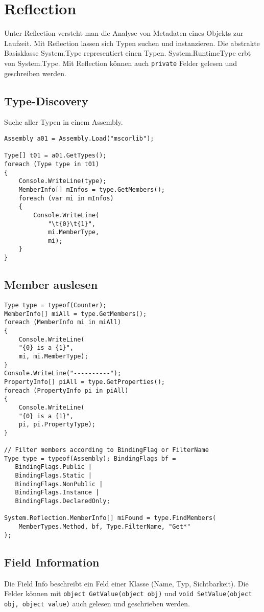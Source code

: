 \section{Reflection}
Unter Reflection versteht man die Analyse von Metadaten eines Objekts zur Laufzeit. Mit Reflection lassen sich Typen suchen und instanzieren. Die abstrakte Basisklasse System.Type representiert einen Typen. System.RuntimeType erbt von System.Type. Mit Reflection können auch \lstinline{private} Felder gelesen und geschreiben werden.

\subsection{Type-Discovery}
Suche aller Typen in einem Assembly.

\begin{lstlisting}
Assembly a01 = Assembly.Load("mscorlib"); 

Type[] t01 = a01.GetTypes(); 
foreach (Type type in t01) 
{
	Console.WriteLine(type); 
	MemberInfo[] mInfos = type.GetMembers(); 
	foreach (var mi in mInfos) 
	{
		Console.WriteLine(
			"\t{0}\t{1}", 
			mi.MemberType, 
			mi);
	}
}
\end{lstlisting}

\subsection{Member auslesen}

\begin{lstlisting}
Type type = typeof(Counter); 
MemberInfo[] miAll = type.GetMembers(); 
foreach (MemberInfo mi in miAll) 
{
	Console.WriteLine(
	"{0} is a {1}",
	mi, mi.MemberType);
} 
Console.WriteLine("----------"); 
PropertyInfo[] piAll = type.GetProperties(); 
foreach (PropertyInfo pi in piAll) 
{
	Console.WriteLine(
	"{0} is a {1}",
	pi, pi.PropertyType);
}

// Filter members according to BindingFlag or FilterName
Type type = typeof(Assembly); BindingFlags bf =
   BindingFlags.Public |
   BindingFlags.Static |
   BindingFlags.NonPublic |
   BindingFlags.Instance |
   BindingFlags.DeclaredOnly;

System.Reflection.MemberInfo[] miFound = type.FindMembers(
	MemberTypes.Method, bf, Type.FilterName, "Get*"
);
\end{lstlisting}

\subsection{Field Information}
Die Field Info beschreibt ein Feld einer Klasse (Name, Typ, Sichtbarkeit). Die Felder können mit \lstinline{object GetValue(object obj)} und \lstinline{void SetValue(object obj, object value)} auch gelesen und geschrieben werden.

